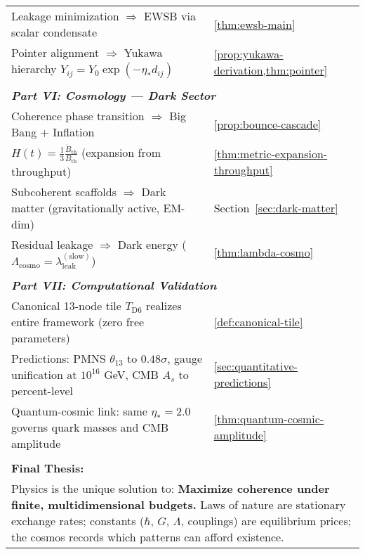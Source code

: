 {\begin{longtable}{p{10cm} p{4.5cm}}
Leakage minimization $\Rightarrow$ EWSB via scalar condensate & \cref{thm:ewsb-main} \\

Pointer alignment $\Rightarrow$ Yukawa hierarchy $Y_{ij} = Y_0 \exp(-\eta_* d_{ij})$ & \cref{prop:yukawa-derivation,thm:pointer} \\
\hline

\multicolumn{2}{c}{\rule{0pt}{3ex}} \\

\multicolumn{2}{l}{\textit{\textbf{Part VI: Cosmology — Dark Sector}}} \\
\hline
Coherence phase transition $\Rightarrow$ Big Bang + Inflation & \cref{prop:bounce-cascade} \\

$H(t) = \frac{1}{3}\frac{\dot{B}_{\mathrm{th}}}{B_{\mathrm{th}}}$ (expansion from throughput) & \cref{thm:metric-expansion-throughput} \\

Subcoherent scaffolds $\Rightarrow$ Dark matter (gravitationally active, EM-dim) & Section~\ref{sec:dark-matter} \\

Residual leakage $\Rightarrow$ Dark energy ($\Lambda_{\mathrm{cosmo}} = \lambda_{\mathrm{leak}}^{(\text{slow})}$) & \cref{thm:lambda-cosmo} \\
\hline

\multicolumn{2}{c}{\rule{0pt}{3ex}} \\

\multicolumn{2}{l}{\textit{\textbf{Part VII: Computational Validation}}} \\
\hline
Canonical 13-node tile $T_{\mathrm{D6}}$ realizes entire framework (zero free parameters) & \cref{def:canonical-tile} \\

Predictions: PMNS $\theta_{13}$ to $0.48\sigma$, gauge unification at $10^{16}$ GeV, CMB $A_s$ to percent-level & \cref{sec:quantitative-predictions} \\

Quantum-cosmic link: same $\eta_* = 2.0$ governs quark masses and CMB amplitude & \cref{thm:quantum-cosmic-amplitude} \\
\hline \hline

\multicolumn{2}{c}{\rule{0pt}{2ex}} \\

\multicolumn{2}{l}{\textbf{Final Thesis:}} \\
\multicolumn{2}{p{14.5cm}}{Physics is the unique solution to: \textbf{Maximize coherence under finite, multidimensional budgets.} Laws of nature are stationary exchange rates; constants ($\hbar$, $G$, $\Lambda$, couplings) are equilibrium prices; the cosmos records which patterns can afford existence.} \\
\hline \hline
\end{longtable}
}%

